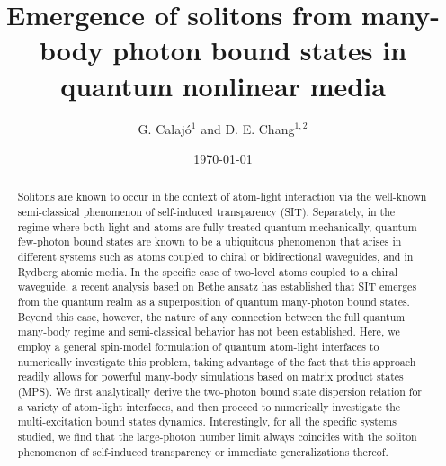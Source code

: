 \documentclass[pra,twocolumn,showpacs,preprintnumbers,amsmath,amssymb]{revtex4-1}
\begin{document}
\title{Emergence of solitons from many-body photon bound states in quantum nonlinear media}


\author{G. Calaj\'o$^1$ and   D. E. Chang$^{1,2}$}





\date{\today}
 
\begin{abstract}
Solitons are  known to occur in the context of atom-light interaction via the well-known semi-classical  phenomenon of self-induced transparency (SIT). 
Separately, in the regime where both light and atoms are fully treated quantum mechanically, quantum few-photon bound states are known to be a ubiquitous phenomenon that arises in different systems such as atoms coupled to chiral or bidirectional waveguides, and in Rydberg atomic media. In the specific case of two-level atoms coupled to a chiral waveguide, a recent analysis based on Bethe ansatz has established that SIT emerges from the quantum realm as a superposition of quantum many-photon bound states.
Beyond this case, however, the nature of any connection between the full quantum many-body regime and semi-classical behavior has not been established. Here, we employ a general spin-model formulation of quantum atom-light interfaces to numerically investigate this problem, taking advantage of the fact that this approach readily allows for powerful many-body simulations based on matrix product states (MPS). %
 We first analytically derive the two-photon bound state dispersion relation for a variety of atom-light interfaces, and then proceed to  numerically investigate the  multi-excitation bound states dynamics. 
Interestingly, for all the specific systems studied, we find that the large-photon number limit always coincides with  the  soliton phenomenon of self-induced transparency or immediate generalizations thereof.



\end{abstract}
\end{document}
